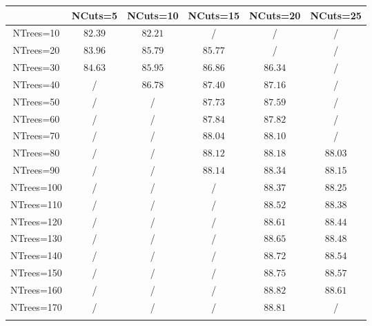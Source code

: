\centering
\begin{tabular}{|cccccc} \toprule\toprule
 & NCuts=5 & NCuts=10 & NCuts=15 & NCuts=20 & NCuts=25\\\midrule
NTrees=10 & $82.39$ & $82.21$ &  / &  / &  /\\
NTrees=20 & $83.96$ & $85.79$ & $85.77$ &  / &  /\\
NTrees=30 & $84.63$ & $85.95$ & $86.86$ & $86.34$ &  /\\
NTrees=40 &  / & $86.78$ & $87.40$ & $87.16$ &  /\\
NTrees=50 &  / &  / & $87.73$ & $87.59$ &  /\\
NTrees=60 &  / &  / & $87.84$ & $87.82$ &  /\\
NTrees=70 &  / &  / & $88.04$ & $88.10$ &  /\\
NTrees=80 &  / &  / & $88.12$ & $88.18$ & $88.03$\\
NTrees=90 &  / &  / & $88.14$ & $88.34$ & $88.15$\\
NTrees=100 &  / &  / &  / & $88.37$ & $88.25$\\
NTrees=110 &  / &  / &  / & $88.52$ & $88.38$\\
NTrees=120 &  / &  / &  / & $88.61$ & $88.44$\\
NTrees=130 &  / &  / &  / & $88.65$ & $88.48$\\
NTrees=140 &  / &  / &  / & $88.72$ & $88.54$\\
NTrees=150 &  / &  / &  / & $88.75$ & $88.57$\\
NTrees=160 &  / &  / &  / & $88.82$ & $88.61$\\
NTrees=170 &  / &  / &  / & $88.81$ &  /\\
\bottomrule\bottomrule\\
\end{tabular}
